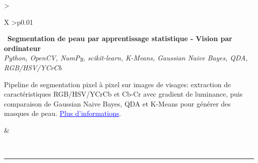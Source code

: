 \documentclass[letterpaper,10pt]{article}
\newcommand{\indentbox}[2][1em]{\hspace*{#1}\parbox{\dimexpr\linewidth-#1\relax}{#2}}
\begin{document}
\begin{tabularx}{\textwidth}{>{\raggedright\arraybackslash}X >{\raggedleft\arraybackslash}p{0.01\textwidth}}
    \begin{minipage}[t]{\linewidth}\raggedright
      \textbullet\ \textbf{Segmentation de peau par apprentissage statistique - Vision par ordinateur}\\
      \textit{\footnotesize Python, OpenCV, NumPy, scikit-learn, K-Means, Gaussian Naive Bayes, QDA, RGB/HSV/YCrCb}\\
      \indentbox{\footnotesize Pipeline de segmentation pixel à pixel sur images de visages: extraction de caractéristiques RGB/HSV/YCrCb et Cb-Cr avec gradient de luminance, puis comparaison de Gaussian Naive Bayes, QDA et K-Means pour générer des masques de peau. \href{https://github.com/JavierTarazona06/Vision_LocalFeatures_BayesianClassification_KMeans/blob/main/docs/rappport/rap.pdf}{\textcolor{blue}{\underline{Plus d'informations}}}.}
    \end{minipage}
    &
    \begin{minipage}[t]{\linewidth}\raggedleft %
    \end{minipage}\\

  \end{tabularx}



  

\vspace{5pt}
\noindent\rule{\textwidth}{0.4pt}
\vspace{1pt}
\end{document}

